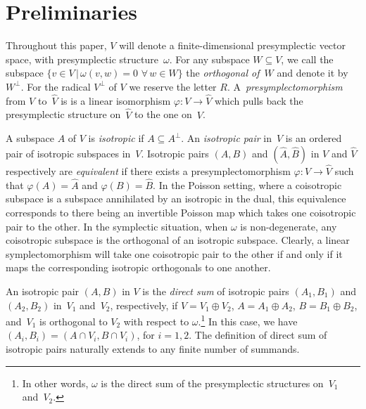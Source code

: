 \documentclass[10pt,a4paper]{amsart}
\numberwithin{equation}{section}
\begin{document}
\section{Preliminaries}\label{preliminaries}

Throughout this paper, $V$ will denote a f\/inite-dimensional presymplectic vector space, with presymplectic structure~$\omega$. For any subspace $W \subseteq V$, we call the subspace $\{ v \in V \,|\, \omega (v, w) = 0$ $\forall \,w \in W \}$ the \textit{orthogonal of~$W$} and denote it by~$W^{\perp}$.
 For the radical $V^{\perp}$ of $V$ we reserve the letter $R$. A~\textit{presymplectomorphism} from $V$ to~$\hat V$ is
is a linear isomorphism $\varphi\colon   V \rightarrow \hat{V}$  which pulls back the presymplectic structure on~$\hat V$ to the one on~$V$.

A subspace $A$ of $V$ is \textit{isotropic} if $A \subseteq A^{\perp}$.  An \textit{isotropic pair} in~$V$ is an ordered pair of isotropic subspaces in~$V$. Isotropic pairs $(A,B)$ and $(\hat A, \hat B)$  in $V$ and $\hat V$ respectively are \textit{equivalent} if there exists a presymplectomorphism $\varphi\colon V \rightarrow \hat V$ such that $\varphi(A) = \hat A$ and $\varphi(B) = \hat B$. In the Poisson setting, where a coisotropic subspace is a subspace annihilated by an isotropic in the dual, this equivalence corresponds to there being an invertible Poisson map which takes one coisotropic pair to the other. In the symplectic situation, when $\omega$ is non-degenerate, any coisotropic subspace is the orthogonal of an isotropic subspace. Clearly, a linear symplectomorphism will take one coisotropic pair to the other if and only if it maps the corresponding isotropic orthogonals to one another.

An isotropic pair $(A,B)$ in $V$ is the \textit{direct sum} of isotropic pairs $(A_1,B_1)$ and $(A_2,B_2)$ in~$V_1$ and~$V_2$, respectively, if $V = V_1 \oplus V_2$, $A = A_1 \oplus A_2$, $B = B_1 \oplus B_2$, and~$V_1$ is orthogonal to $V_2$ with respect to $\omega$.\footnote{In other words, $\omega$ is the direct sum of the presymplectic structures on~$V_1$ and~$V_2$.} In this case, we have $(A_i,B_i) = (A \cap V_i, B \cap V_i)$, for $i = 1,2$. The def\/inition of direct sum of isotropic pairs naturally extends to any f\/inite number of summands.
\end{document}
